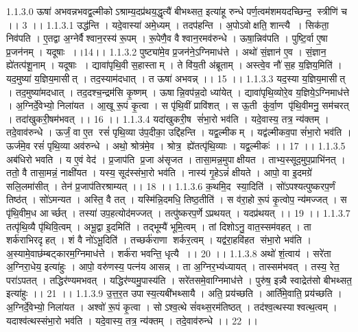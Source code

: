 1.1.3.0
ऊषा॑ अभवन्नभवद्व॒ल्मीकोऽश्राम्य॒दप्र॑थय॒द्धृत्यै॑ बीभथ्सत॒ इत्या॑हू रुन्धे पर्ण॒त्वम॑शमयदच्छिन्द॒॒ स्त्रीणि॑ च ।। 3 ।।
1.1.3.1
उद्ध॑न्ति । यदे॒वास्या॑ अमे॒ध्यम् । तदप॑हन्ति । अ॒पोऽवोक्षति॒ शान्त्यै । सिक॑ता॒ निव॑पति । ए॒तद्वा अ॒ग्नेर्वैश्वान॒रस्य॑ रू॒पम् । रू॒पेणै॒व वैश्वान॒रमव॑रुन्धे । ऊषा॒न्निव॑पति । पुष्टि॒र्वा ए॒षा प्र॒जन॑नम् । यदूषाः ।।14।।
1.1.3.2
पुष्ट्या॑मे॒व प्र॒जन॑ने॒ऽग्निमाध॑त्ते । अथो॑ सं॒ज्ञान॑ ए॒व । सं॒ज्ञान॒॒ ह्ये॑तत्प॑शू॒नाम् । यदूषाः । द्यावा॑पृथि॒वी स॒हास्ताम् । ते वि॑य॒ती अ॑ब्रूताम् । अस्त्वे॒व नौ॑ स॒ह य॒ज्ञिय॒मिति॑ । यद॒मुष्या॑ य॒ज्ञिय॒मासीत् । तद॒स्याम॑दधात् । त ऊषा॑ अभवन्न् ।। 15 ।।
1.1.3.3
यद॒स्या य॒ज्ञिय॒मासीत् । तद॒मुष्या॑मदधात् । तद॒दश्च॒न्द्रम॑सि कृ॒ष्णम् । ऊषान्नि॒वप॑न्न॒दो ध्या॑येत् । द्यावा॑पृथि॒व्योरे॒व य॒ज्ञिये॒ऽग्निमाध॑त्ते । अ॒ग्निर्दे॒वेभ्यो॒ निला॑यत । आ॒खू रू॒पं कृ॒त्वा । स पृ॑थि॒वीं प्रावि॑शत् । स ऊ॒ती कु॑र्वा॒ण पृ॑थि॒वीमनु॒ सम॑चरत् । तदा॑खुकरी॒षम॑भवत् ।। 16 ।।
1.1.3.4
यदा॑खुकरी॒ष सं॑भा॒रो भव॑ति । यदे॒वास्य॒ तत्र॒ न्य॑क्तम् । तदे॒वाव॑रुन्धे । ऊर्जं॒ वा ए॒त रसं॑ पृथि॒व्या उ॑प॒दीका॒ उद्दि॑हन्ति । यद्व॒ल्मीकम् । यद्व॑ल्मीकव॒पा सं॑भा॒रो भव॑ति । ऊर्ज॑मे॒व रसं॑ पृथि॒व्या अव॑रुन्धे । अथो॒ श्रोत्र॑मे॒व । श्रोत्र॒॒ ह्ये॑तत्पृ॑थि॒व्याः । यद्व॒ल्मीकः॑ ।। 17 ।।
1.1.3.5
अब॑धिरो भवति । य ए॒वं वेद॑ । प्र॒जाप॑ति प्र॒जा अ॑सृजत । तासा॒मन्न॒मुपाक्षीयत । ताभ्य॒स्सूद॒मुप॒प्राभि॑नत् । ततो॒ वै तासा॒मन्नं॒ नाक्षी॑यत । यस्य॒ सूद॑स्संभा॒रो भव॑ति । नास्य॑ गृ॒हेऽन्नं॑ क्षीयते । आपो॒ वा इ॒दमग्रे॑ सलि॒लमा॑सीत् । तेन॑ प्र॒जाप॑तिरश्राम्यत् ।। 18 ।।
1.1.3.6
क॒थमि॒द स्या॒दिति॑ । सो॑ऽपश्यत्पुष्करप॒र्णं तिष्ठ॑त् । सो॑ऽमन्यत । अस्ति॒ वै तत् । यस्मि॑न्नि॒दमधि॒ तिष्ठ॒तीति॑ । स व॑रा॒हो रू॒पं कृ॒त्वोप॒ न्य॑मज्जत् । स पृ॑थि॒वीम॒ध आर्च्छत् । तस्या॑ उप॒हत्योद॑मज्जत् । तत्पु॑ष्करप॒र्णेऽप्रथयत् । यदप्र॑थयत् ।। 19 ।।
1.1.3.7
तत्पृ॑थि॒व्यै पृ॑थिवि॒त्वम् । अभू॒द्वा इ॒दमिति॑ । तद्भूम्यै॑ भूमि॒त्वम् । तां दिशोऽनु॒ वात॒स्सम॑वहत् । ता शर्क॑राभिरदृहत् । शं वै नो॑ऽभू॒दिति॑ । तच्छर्क॑राणा शर्कर॒त्वम् । यद्व॑रा॒हवि॑हत संभा॒रो भव॑ति । अ॒स्यामे॒वाछ॑म्बट्कारम॒ग्निमाध॑त्ते । शर्क॑रा भवन्ति॒ धृत्यै ।। 20 ।।
1.1.3.8
अथो॑ शं॒त्वाय॑ । सरे॑ता अ॒ग्निरा॒धेय॒ इत्या॑हुः । आपो॒ वरु॑णस्य॒ पत्न॑य आसन्न् । ता अ॒ग्निर॒भ्य॑ध्यायत् । तास्सम॑भवत् । तस्य॒ रेत॒ परा॑ऽपतत् । तद्धिर॑ण्यमभवत् । यद्धिर॑ण्यमु॒पास्य॑ति । सरे॑तसमे॒वाग्निमाध॑त्ते । पुरु॑ष॒ इन्न्वै स्वाद्रेत॑सो बीभथ्सत॒ इत्या॑हुः ।। 21 ।।
1.1.3.9
उ॒त्त॒र॒त उपास्य॒त्यबी॑भथ्सायै । अति॒ प्रय॑च्छति । आर्ति॑मे॒वाति॒ प्रय॑च्छति । अ॒ग्निर्दे॒वेभ्यो॒ निला॑यत । अश्वो॑ रू॒पं कृ॒त्वा । सोऽश्व॒त्थे सं॑वथ्स॒रम॑तिष्ठत् । तद॑श्व॒त्थस्याश्वत्थ॒त्वम् । यदाश्व॑त्थस्संभा॒रो भव॑ति । यदे॒वास्य॒ तत्र॒ न्य॑क्तम् । तदे॒वाव॑रुन्धे ।। 22 ।।

